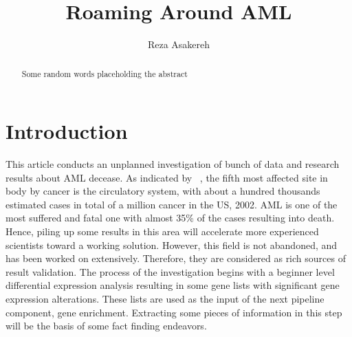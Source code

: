 \documentclass[3p,authoryear,preprint,12pt]{elsarticle}
\begin{document}
\begin{frontmatter}
	
\title{Roaming Around AML
}
    
\author[abb6a21433054]{Reza Asakereh}
    
\address[abb6a21433054]{CE Department\unskip, 
    Sharif University of Technology}
  

\begin{abstract}
 Some random words placeholding the abstract
\end{abstract}
\end{frontmatter}
    
\section{Introduction}
 This article conducts an unplanned investigation of bunch of data and research results about AML decease. As indicated by \unskip~\citet{544198:12418069}, the fifth most affected site in body by cancer is the circulatory system, with about a hundred thousands estimated cases in total of a million cancer in the US, 2002. AML is one of the most suffered and fatal one with almost 35\% of the cases resulting into death. Hence, piling up some results in this area will accelerate more experienced scientists toward a working solution. However, this field is not abandoned, and has been worked on extensively. Therefore, they are considered as rich sources of result validation. The process of the investigation begins with a beginner level differential expression analysis resulting in some gene lists with significant gene expression alterations. These lists are used as the input of the next pipeline component, gene enrichment. Extracting some pieces of information in this step will be the basis of some fact finding endeavors.
\end{document}
